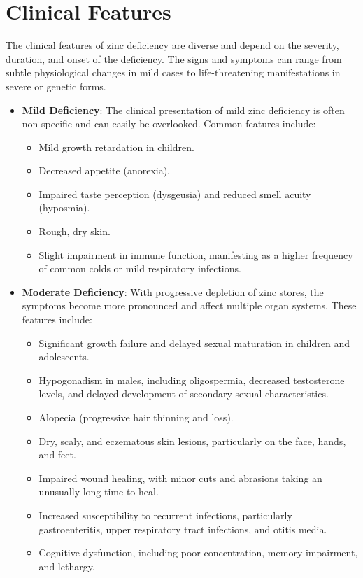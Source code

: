 \section*{Clinical Features}
The clinical features of zinc deficiency are diverse and depend on the severity, duration, and onset of the deficiency. The signs and symptoms can range from subtle physiological changes in mild cases to life-threatening manifestations in severe or genetic forms.
\begin{itemize}
    \item \textbf{Mild Deficiency}: The clinical presentation of mild zinc deficiency is often non-specific and can easily be overlooked. Common features include:
    \begin{itemize}
        \item Mild growth retardation in children.
        \item Decreased appetite (anorexia).
        \item Impaired taste perception (dysgeusia) and reduced smell acuity (hyposmia).
        \item Rough, dry skin.
        \item Slight impairment in immune function, manifesting as a higher frequency of common colds or mild respiratory infections.
    \end{itemize}
    \item \textbf{Moderate Deficiency}: With progressive depletion of zinc stores, the symptoms become more pronounced and affect multiple organ systems. These features include:
    \begin{itemize}
        \item Significant growth failure and delayed sexual maturation in children and adolescents.
        \item Hypogonadism in males, including oligospermia, decreased testosterone levels, and delayed development of secondary sexual characteristics.
        \item Alopecia (progressive hair thinning and loss).
        \item Dry, scaly, and eczematous skin lesions, particularly on the face, hands, and feet.
        \item Impaired wound healing, with minor cuts and abrasions taking an unusually long time to heal.
        \item Increased susceptibility to recurrent infections, particularly gastroenteritis, upper respiratory tract infections, and otitis media.
        \item Cognitive dysfunction, including poor concentration, memory impairment, and lethargy.

\end{itemize}
\end{itemize}
